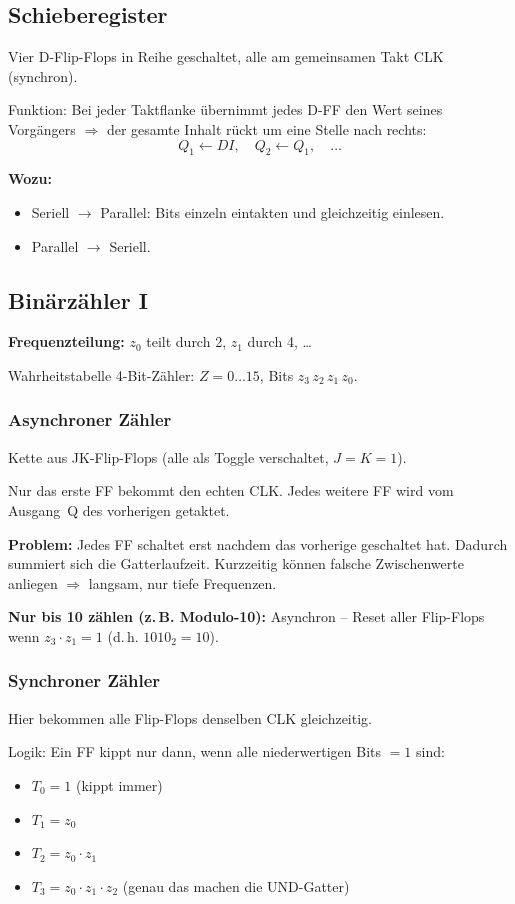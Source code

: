 \documentclass[11pt,a4paper]{article}
\begin{document}
\subsection{Schieberegister}
Vier D-Flip-Flops in Reihe geschaltet, alle am gemeinsamen Takt CLK (synchron).

Funktion: Bei jeder Taktflanke übernimmt jedes D-FF den Wert seines Vorgängers $\Rightarrow$ der gesamte Inhalt rückt um eine Stelle nach rechts:
$$Q_1 \leftarrow DI, \quad Q_2 \leftarrow Q_1, \quad \ldots$$

\textbf{Wozu:}
\begin{itemize}
    \item Seriell $\to$ Parallel: Bits einzeln eintakten und gleichzeitig einlesen.
    \item Parallel $\to$ Seriell.
\end{itemize}

\subsection{Binärzähler I}
\textbf{Frequenzteilung:} $z_0$ teilt durch 2, $z_1$ durch 4, \ldots

Wahrheitstabelle 4-Bit-Zähler: $Z = 0 \ldots 15$, Bits $z_3\,z_2\,z_1\,z_0$.

\subsubsection{Asynchroner Zähler}
Kette aus JK-Flip-Flops (alle als Toggle verschaltet, $J = K = 1$).

Nur das erste FF bekommt den echten CLK. Jedes weitere FF wird vom Ausgang~Q des vorherigen getaktet.

\textbf{Problem:} Jedes FF schaltet erst nachdem das vorherige geschaltet hat. Dadurch summiert sich die Gatterlaufzeit. Kurzzeitig können falsche Zwischenwerte anliegen $\Rightarrow$ langsam, nur tiefe Frequenzen.

\textbf{Nur bis 10 zählen (z.\,B. Modulo-10):} Asynchron -- Reset aller Flip-Flops wenn $z_3 \cdot z_1 = 1$ (d.\,h. $1010_2 = 10$).

\subsubsection{Synchroner Zähler}
Hier bekommen alle Flip-Flops denselben CLK gleichzeitig.

Logik: Ein FF kippt nur dann, wenn alle niederwertigen Bits $=1$ sind:
\begin{itemize}
    \item $T_0 = 1$ (kippt immer)
    \item $T_1 = z_0$
    \item $T_2 = z_0 \cdot z_1$
    \item $T_3 = z_0 \cdot z_1 \cdot z_2$ (genau das machen die UND-Gatter)
\end{itemize}
\end{document}
